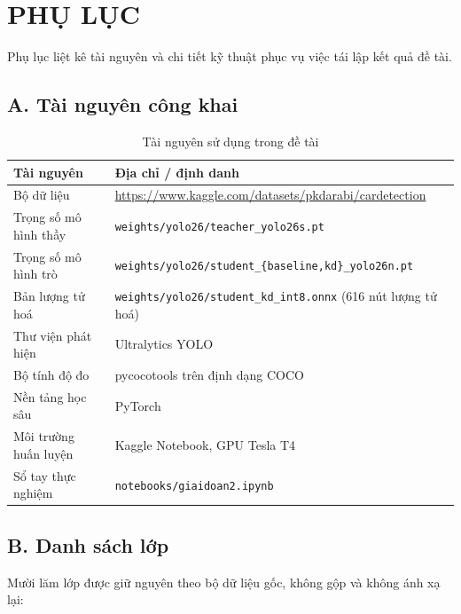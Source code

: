 \chapter*{PHỤ LỤC}

Phụ lục liệt kê tài nguyên và chi tiết kỹ thuật phục vụ việc tái lập kết quả đề tài.

\section*{A. Tài nguyên công khai}

\begin{table}[H]
\centering
\caption{Tài nguyên sử dụng trong đề tài}
\label{tab:tainguyen}
\small
\begin{tabular}{p{4.0cm} p{9.5cm}}
\toprule
\textbf{Tài nguyên} & \textbf{Địa chỉ / định danh} \\
\midrule
Bộ dữ liệu & \url{https://www.kaggle.com/datasets/pkdarabi/cardetection} \\
Trọng số mô hình thầy & \texttt{weights/yolo26/teacher\_yolo26s.pt} \\
Trọng số mô hình trò & \texttt{weights/yolo26/student\_\{baseline,kd\}\_yolo26n.pt} \\
Bản lượng tử hoá & \texttt{weights/yolo26/student\_kd\_int8.onnx} (616 nút lượng tử hoá) \\
Thư viện phát hiện & Ultralytics YOLO \cite{jocher2023ultralytics} \\
Bộ tính độ đo & pycocotools trên định dạng COCO \cite{lin2014coco} \\
Nền tảng học sâu & PyTorch \cite{paszke2019pytorch} \\
Môi trường huấn luyện & Kaggle Notebook, GPU Tesla T4 \\
Sổ tay thực nghiệm & \texttt{notebooks/giaidoan2.ipynb} \\
\bottomrule
\end{tabular}
\end{table}

\section*{B. Danh sách lớp}

Mười lăm lớp được giữ nguyên theo bộ dữ liệu gốc, không gộp và không ánh xạ lại:

